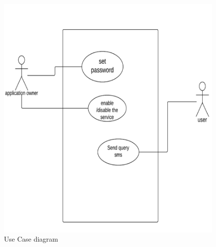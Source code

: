 	
	\begin{figure}[h!]
		\includegraphics[width=5.5in]{usecase.png} %
		\caption{Use Case diagram}
		\label{fig:5} %
		
	\end{figure} 

	 
	

